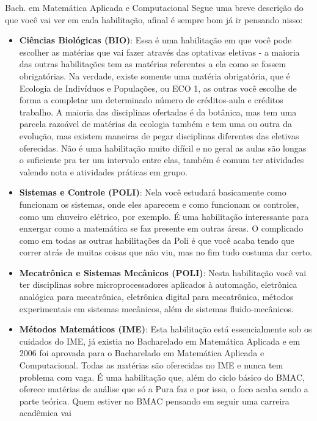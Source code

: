 \begin{subsecao}{Bach. em Matemática Aplicada e Computacional}
Segue uma breve descrição do que você vai ver em cada habilitação, afinal é sempre bom já ir pensando nisso:

\begin{itemize}
  \item \textbf{Ciências Biológicas (BIO)}:
    Essa é uma habilitação em que você pode escolher as matérias que vai fazer
    através das optativas eletivas - a maioria das outras habilitações tem as
    matérias referentes a ela como se fossem obrigatórias. Na verdade, existe
    somente uma matéria obrigatória, que é Ecologia de Indivíduos e Populações,
    ou ECO 1, as outras você escolhe de forma a completar um determinado número
    de créditos-aula e créditos trabalho. A maioria das disciplinas ofertadas
    é da botânica, mas tem uma parcela razoável de matérias da ecologia também
    e tem uma ou outra da evolução, mas existem maneiras de pegar disciplinas
    diferentes das eletivas oferecidas. Não é uma habilitação muito difícil e no
    geral as aulas são longas o suficiente pra ter um intervalo entre elas,
    também é comum ter atividades valendo nota e atividades práticas em grupo.
  \item \textbf{Sistemas e Controle (POLI)}: Nela você estudará basicamente como
    funcionam os sistemas, onde eles aparecem e como funcionam os controles,
    como um chuveiro elétrico, por exemplo. É uma habilitação interessante para
    enxergar como a matemática se faz presente em outras áreas. O complicado
    como em todas as outras habilitações da Poli é que você acaba tendo que
    correr atrás de muitas coisas que não viu, mas no fim tudo costuma dar
    certo.
  \item \textbf{Mecatrônica e Sistemas Mecânicos (POLI)}: Nesta habilitação você
    vai ter disciplinas sobre microprocessadores aplicados à automação,
    eletrônica analógica para mecatrônica, eletrônica digital para mecatrônica,
    métodos experimentais em sistemas mecânicos, além de sistemas
    fluido-mecânicos.
  \item \textbf{Métodos Matemáticos (IME)}: Esta habilitação está essencialmente
    sob os cuidados do IME, já existia no Bacharelado em Matemática Aplicada e
    em 2006 foi aprovada para o Bacharelado em Matemática Aplicada e
    Computacional. Todas as matérias são oferecidas no IME e nunca tem problema
    com vaga. É uma habilitação que, além do ciclo básico do BMAC, oferece
    matérias de análise que só a Pura faz e por isso, o foco acaba sendo a parte
    teórica. Quem estiver no BMAC pensando em seguir uma carreira acadêmica vai

\end{itemize}
\end{subsecao}
